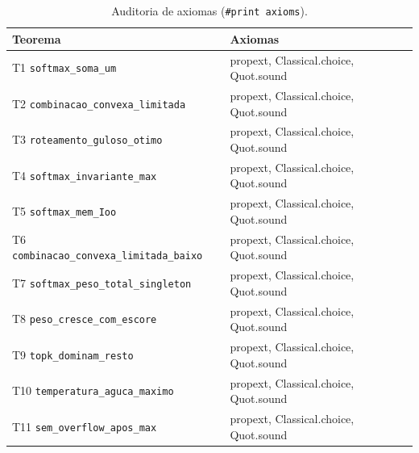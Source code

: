 \begin{table}[htbp]
\fontsize{10}{12}\selectfont\SingleSpacing
\centering
\caption{Auditoria de axiomas (\texttt{\#print axioms}).}
\label{tab:ax}
\begin{tabularx}{\textwidth}{XX}
\toprule
Teorema & Axiomas \\
\midrule
T1 \texttt{softmax\_soma\_um} & propext, Classical.choice, Quot.sound \\
T2 \nolinkurl{combinacao_convexa_limitada} & propext, Classical.choice, Quot.sound \\
T3 \nolinkurl{roteamento_guloso_otimo} & propext, Classical.choice, Quot.sound \\
T4 \texttt{softmax\_invariante\_max} & propext, Classical.choice, Quot.sound \\
T5 \texttt{softmax\_mem\_Ioo} & propext, Classical.choice, Quot.sound \\
T6 \nolinkurl{combinacao_convexa_limitada_baixo} & propext, Classical.choice, Quot.sound \\
T7 \nolinkurl{softmax_peso_total_singleton} & propext, Classical.choice, Quot.sound \\
T8 \nolinkurl{peso_cresce_com_escore} & propext, Classical.choice, Quot.sound \\
T9 \texttt{topk\_dominam\_resto} & propext, Classical.choice, Quot.sound \\
T10 \nolinkurl{temperatura_aguca_maximo} & propext, Classical.choice, Quot.sound \\
T11 \texttt{sem\_overflow\_apos\_max} & propext, Classical.choice, Quot.sound \\
\bottomrule
\end{tabularx}
\end{table}
